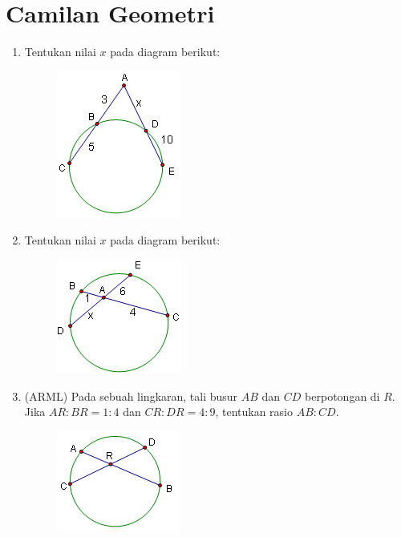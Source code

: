 \documentclass[12pt]{scrartcl}
\begin{document}
\section{Camilan Geometri}
\begin{enumerate}[resume]

\item Tentukan nilai $x$ pada diagram berikut:
    \begin{figure}[H]
        \centering
        \includegraphics[scale=1]{0Figure/Popprob1.png}
    \end{figure}

\item Tentukan nilai $x$ pada diagram berikut:
    
    \begin{figure}[H]
        \centering
        \includegraphics[scale=1]{0Figure/Popprob2.png}
    \end{figure}

\item (ARML) Pada sebuah lingkaran, tali busur $AB$ dan $CD$ berpotongan di $R$. Jika $AR : BR = 1 : 4$ dan $CR : DR = 4 : 9$, tentukan rasio $AB : CD$.
    
    \begin{figure}[H]
        \centering
        \includegraphics[scale=1]{0Figure/Popprob3.png}
    \end{figure}
    

\end{enumerate}
\end{document}
